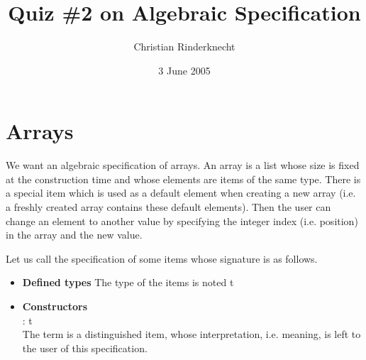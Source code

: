 \documentclass[11pt,a4paper]{article}
\title{Quiz \#2 on Algebraic Specification}
\author{Christian Rinderknecht}
\date{3 June 2005}
\newcommand\type[1]{\textsf{#1}}
\begin{document}
\maketitle

\section{Arrays}

We want an algebraic specification of arrays. An array is a list whose
size is fixed at the construction time and whose elements are items of
the same type. There is a special item which is used as a default
element when creating a new array (i.e. a freshly created array
contains these default elements). Then the user can change an element
to another value by specifying the integer index (i.e. position) in
the array and the new value.

\noindent Let us call  the specification of some items whose
signature is as follows.
\begin{itemize}

   \item \textbf{Defined types}
   The type of the items is noted \type{t}

   \item \textbf{Constructors}\\
    : \type{t}\\
   The term  is a distinguished item, whose
   interpretation, i.e. meaning, is left to the user of this
   specification.

\end{itemize}
\end{document}

